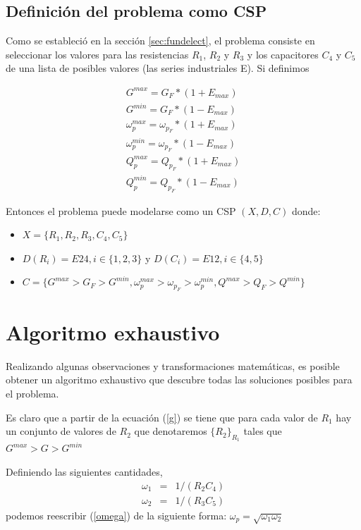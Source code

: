\documentclass{llncs}
\begin{document}
	\subsection{Definición del problema como CSP}
		\label{subsec:problemDefinition}
		Como se estableció en la sección \ref{sec:fundelect}, el problema consiste en seleccionar
		los valores para las resistencias $R_1$, $R_2$ y $R_3$ y los capacitores $C_4$ y $C_5$ de
		una lista de posibles valores (las series industriales E). Si definimos
		
		\begin{align*}
		G^{max} = G_F * (1 + E_{max})\\
		G^{min} = G_F * (1 - E_{max})\\
		\omega_p^{max} = \omega_{p_F} * (1 + E_{max})\\
		\omega_p^{min} = \omega_{p_F} * (1 - E_{max})\\
		Q_p^{max} = Q_{p_F} * (1 + E_{max})\\
		Q_p^{min} = Q_{p_F} * (1 - E_{max})
		\end{align*}
		
		Entonces el problema puede modelarse como un CSP $(X, D, C)$ donde:
		
		\begin{itemize}
			\item $X = \{R_1, R_2, R_3, C_4, C_5\}$
			\item $D(R_i) = E24, i \in \{1,2,3\}$ y $D(C_i) = E12, i \in \{4,5\}$
			\item $C = \{G^{max} > G_F > G^{min}, \omega_p^{max} > \omega_{p_F} > \omega_p^{min},
			Q^{max} > Q_F > Q^{min}\}$
		\end{itemize}
    

  \section{\textbf{Algoritmo exhaustivo}}
  	\label{sec:exhaustSearch}
    Realizando algunas observaciones y transformaciones matemáticas, es posible obtener un algoritmo exhaustivo que descubre
    todas las soluciones posibles para el problema.

    Es claro que a partir de la ecuación (\ref{g}) se tiene que para cada valor de $R_1$ hay
    un conjunto de valores de $R_2$ que denotaremos 
    $\{R_2\}_{R_1}$ tales que $G^{max} > G > G^{min}$

    Definiendo las siguientes cantidades,
    \begin{eqnarray}
      \omega_1 &=& 1/(R_2 C_4) \nonumber \\
      \omega_2 &=& 1/(R_3 C_5)
      \label{omegas}
    \end{eqnarray}
    podemos reescribir (\ref{omega}) de la siguiente forma: $\omega_p = \sqrt{\omega_1  \omega_2}$
\end{document}
